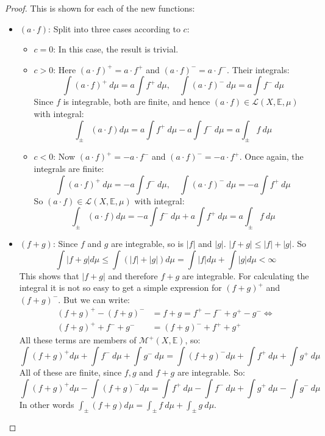 \documentclass[12pt, a4paper]{article}
\numberwithin{equation}{section}
\begin{document}
\begin{proof}
This is shown for each of the new functions:
\begin{itemize}
\item $(a\cdot f)$: Split into three cases according to $c$:
\begin{itemize}
\item $c=0$: In this case, the result is trivial.
\item $c>0$: Here $(a\cdot f)^+=a\cdot f^+$ and $(a\cdot f)^-=a\cdot f^-$. Their integrals:
\begin{equation}
\int(a\cdot f)^+\ d\mu=a\int f^+\ d\mu,\quad\int(a\cdot f)^-\ d\mu=a\int f^-\ d\mu
\end{equation}
Since $f$ is integrable, both are finite, and hence $(a\cdot f)\in\mathcal{L}(X,\mathbb{E},\mu)$ with integral:
\begin{equation}
\int_\pm(a\cdot f)d\mu=a\int f^+\ d\mu-a\int f^-\ d\mu=a\int_\pm f\ d\mu
\end{equation}
\item $c<0$: Now $(a\cdot f)^+=-a\cdot f^-$ and $(a\cdot f)^-=-a\cdot f^+$. Once again, the integrals are finite:
\begin{equation}
\int(a\cdot f)^+\ d\mu=-a\int f^-\ d\mu,\quad\int(a\cdot f)^-\ d\mu=-a\int f^+\ d\mu
\end{equation}
So $(a\cdot f)\in\mathcal{L}(X,\mathbb{E},\mu)$ with integral:
\begin{equation}
\int_\pm(a\cdot f)d\mu=-a\int f^-\ d\mu+a\int f^+\ d\mu=a\int_\pm f\ d\mu
\end{equation}
\end{itemize}
\item $(f+g)$: Since $f$ and $g$ are integrable, so is $|f|$ and $|g|$. $|f+g|\le|f|+|g|$. So
\begin{equation}
\int|f+g|d\mu\le\int(|f|+|g|)d\mu=\int|f|d\mu+\int|g|d\mu<\infty
\end{equation}
This shows that $|f+g|$ and therefore $f+g$ are integrable. For calculating the integral it is not so easy to get a simple expression for $(f+g)^+$ and $(f+g)^-$. But we can write:
\begin{align}
(f+g)^+ - (f+g)^- &= f+g = f^+ - f^- + g^+ - g^-\Leftrightarrow\\
(f+g)^+ + f^- + g^- &= (f+g)^- + f^+ + g^+
\end{align}
All these terms are members of $\mathcal{M}^+(X,\mathbb{E})$, so:
\begin{equation}
\int(f+g)^+ d\mu + \int f^-\ d\mu + \int g^-\ d\mu = \int(f+g)^- d\mu + \int f^+\ d\mu + \int g^+\ d\mu 
\end{equation}
All of these are finite, since $f, g$ and $f+g$ are integrable. So:
\begin{equation}
\int(f+g)^+ d\mu - \int(f+g)^- d\mu=\int f^+\ d\mu - \int f^-\ d\mu + \int g^+\ d\mu - \int g^-\ d\mu
\end{equation}
In other words $\int_\pm(f+g)d\mu=\int_\pm f\ d\mu + \int_\pm g\ d\mu$.
\end{itemize}
\end{proof}
\end{document}
